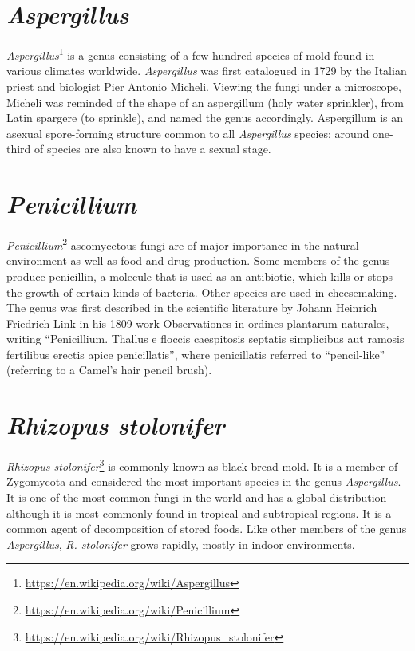 \documentclass[]{book}
\let\rmarkdownfootnote\footnote%
\def\footnote{\protect\rmarkdownfootnote}
\renewcommand{\href}[2]{#2\footnote{\url{#1}}}
\begin{document}
\hypertarget{aspergillus}{%
\section{\texorpdfstring{\emph{Aspergillus}}{Aspergillus}}\label{aspergillus}}

\href{https://en.wikipedia.org/wiki/Aspergillus}{\emph{Aspergillus}} is a genus consisting of a few hundred species of mold found in various climates worldwide. \emph{Aspergillus} was first catalogued in 1729 by the Italian priest and biologist Pier Antonio Micheli. Viewing the fungi under a microscope, Micheli was reminded of the shape of an aspergillum (holy water sprinkler), from Latin spargere (to sprinkle), and named the genus accordingly. Aspergillum is an asexual spore-forming structure common to all \emph{Aspergillus} species; around one-third of species are also known to have a sexual stage.

\hypertarget{penicillium}{%
\section{\texorpdfstring{\emph{Penicillium}}{Penicillium}}\label{penicillium}}

\href{https://en.wikipedia.org/wiki/Penicillium}{\emph{Penicillium}} ascomycetous fungi are of major importance in the natural environment as well as food and drug production. Some members of the genus produce penicillin, a molecule that is used as an antibiotic, which kills or stops the growth of certain kinds of bacteria. Other species are used in cheesemaking. The genus was first described in the scientific literature by Johann Heinrich Friedrich Link in his 1809 work Observationes in ordines plantarum naturales, writing ``Penicillium. Thallus e floccis caespitosis septatis simplicibus aut ramosis fertilibus erectis apice penicillatis'', where penicillatis referred to ``pencil-like'' (referring to a Camel's hair pencil brush).

\hypertarget{rhizopus-stolonifer}{%
\section{\texorpdfstring{\emph{Rhizopus stolonifer}}{Rhizopus stolonifer}}\label{rhizopus-stolonifer}}

\href{https://en.wikipedia.org/wiki/Rhizopus_stolonifer}{\emph{Rhizopus stolonifer}} is commonly known as black bread mold. It is a member of Zygomycota and considered the most important species in the genus \emph{Aspergillus}. It is one of the most common fungi in the world and has a global distribution although it is most commonly found in tropical and subtropical regions. It is a common agent of decomposition of stored foods. Like other members of the genus \emph{Aspergillus}, \emph{R. stolonifer} grows rapidly, mostly in indoor environments.
\end{document}
